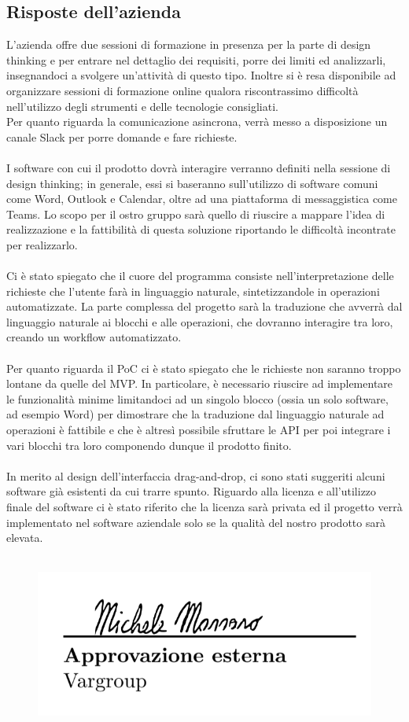 \subsection{Risposte dell'azienda}
L'azienda offre due sessioni di formazione in presenza per la parte di design thinking e per entrare nel dettaglio dei requisiti, porre dei limiti ed analizzarli, insegnandoci a svolgere un'attività di questo tipo.
Inoltre si è resa disponibile ad organizzare sessioni di formazione online qualora riscontrassimo difficoltà nell’utilizzo degli strumenti e delle tecnologie consigliati.\\
Per quanto riguarda la comunicazione asincrona, verrà messo a disposizione un canale Slack per porre domande e fare richieste.\\
\\
I software con cui il prodotto dovrà interagire verranno definiti nella sessione di design thinking; in generale, essi si baseranno sull'utilizzo di software comuni come Word, Outlook e Calendar, oltre ad una piattaforma di messaggistica come Teams.
Lo scopo per il ostro gruppo sarà quello di riuscire a mappare l'idea di realizzazione e la fattibilità di questa soluzione riportando le difficoltà incontrate per realizzarlo.\\
\\
Ci è stato spiegato che il cuore del programma consiste nell'interpretazione delle richieste che l'utente farà in linguaggio naturale, sintetizzandole in operazioni automatizzate.
La parte complessa del progetto sarà la traduzione che avverrà dal linguaggio naturale ai blocchi e alle operazioni, che dovranno interagire tra loro, creando un workflow automatizzato.\\
\\
Per quanto riguarda il PoC ci è stato spiegato che le richieste non saranno troppo lontane da quelle del MVP.
In particolare, è necessario riuscire ad implementare le funzionalità minime limitandoci ad un singolo blocco (ossia un solo software, ad esempio Word) per dimostrare che la traduzione dal linguaggio naturale ad operazioni è fattibile e che è altresì possibile sfruttare le API per poi integrare i vari blocchi tra loro componendo dunque il prodotto finito.\\
\\
In merito al design dell'interfaccia drag-and-drop, ci sono stati suggeriti alcuni software già esistenti da cui trarre spunto.
Riguardo alla licenza e all'utilizzo finale del software ci è stato riferito che la licenza sarà privata ed il progetto verrà implementato nel software aziendale solo se la qualità del nostro prodotto sarà elevata.\\\\

\vspace{2cm}
\begin{figure}[h!]
        \raggedleft
        \includegraphics[width=0.35\linewidth]{template/images/Screenshot 2024-10-30 154716.png}
\end{figure}